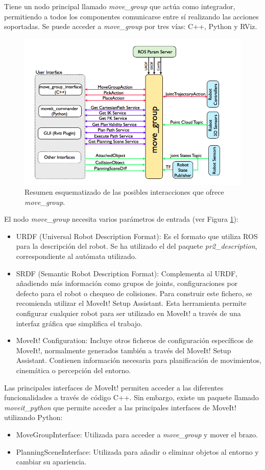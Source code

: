 \documentclass[12pt,spanish,chapterprefix, numbers=noenddot]{book}
\numberwithin{equation}{section}
\numberwithin{figure}{section}
\begin{document}
Tiene un nodo principal llamado \textit{move\_group } que actúa como integrador, permitiendo a todos los componentes comunicarse entre sí realizando las acciones soportadas. 
Se puede acceder a \textit{move\_group } por tres vías: C++, Python y RViz.
\begin{figure}[hbt!]
\centering
\includegraphics[width=12cm]{Figs/moveGroup.png}
\par
\caption{\label{fig:moveGroup}Resumen esquematizado de las posibles interacciones que ofrece \textit{move\_group}.}
\end{figure}
El nodo \textit{move\_group} necesita varios parámetros de entrada (ver Figura \ref{fig:moveGroup}):
\begin{itemize}
\item URDF (Universal Robot Description Format): Es el formato que utiliza ROS para la descripción del robot. Se ha utilizado el del paquete \textit{pr2\_description}, correspondiente al autómata utilizado.
\item SRDF (Semantic Robot Description Format): Complementa al URDF, añadiendo más información como grupos de joints, configuraciones por defecto para el robot o chequeo de colisiones. Para construir este fichero, se recomienda utilizar el MoveIt! Setup Assistant. Esta herramienta permite configurar cualquier robot para ser utilizado en MoveIt! a través de una interfaz gráfica que simplifica el trabajo. 
\item MoveIt! Configuration: Incluye otros ficheros de configuración específicos de MoveIt!, normalmente generados también a través del MoveIt! Setup Assistant. Contienen información necesaria para planificación de movimientos, cinemática o percepción del entorno.
\end{itemize}
Las principales interfaces de MoveIt! permiten acceder a las diferentes funcionalidades a través de código C++. Sin embargo, existe un paquete llamado \textit{moveit\_python} que permite acceder a las principales interfaces de MoveIt! utilizando Python:
\begin{itemize}
\item MoveGroupInterface: Utilizada para acceder a \textit{move\_group } y mover el brazo. 
\item PlanningSceneInterface: Utilizada para añadir o eliminar objetos al entorno y cambiar su apariencia.
\end{itemize}
\end{document}
